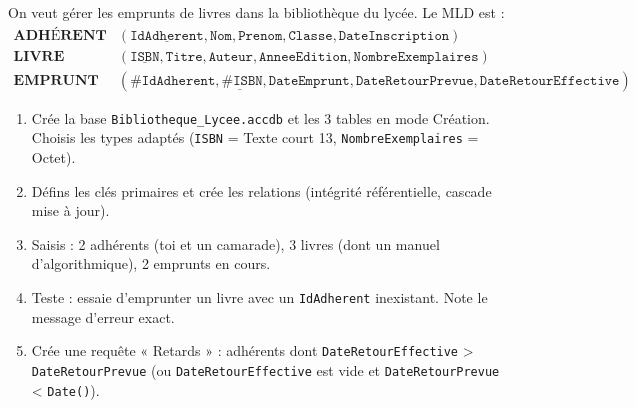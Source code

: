 \documentclass[11pt]{article}
\begin{document}
\begin{exercice}
On veut gérer les emprunts de livres dans la bibliothèque du lycée. Le MLD est :
\begin{align*}
\textbf{ADHÉRENT} &(\underline{\texttt{IdAdherent}}, \texttt{Nom}, \texttt{Prenom}, \texttt{Classe}, \texttt{DateInscription}) \\
\textbf{LIVRE}    &(\underline{\texttt{ISBN}}, \texttt{Titre}, \texttt{Auteur}, \texttt{AnneeEdition}, \texttt{NombreExemplaires}) \\
\textbf{EMPRUNT}  &(\underline{\texttt{\#IdAdherent}, \texttt{\#ISBN}, \texttt{DateEmprunt}}, \texttt{DateRetourPrevue}, \texttt{DateRetourEffective})
\end{align*}
\begin{enumerate}
    \item Crée la base \texttt{Bibliotheque\_Lycee.accdb} et les 3 tables en mode Création. Choisis les types adaptés (\texttt{ISBN} = Texte court 13, \texttt{NombreExemplaires} = Octet).
    \item Défins les clés primaires et crée les relations (intégrité référentielle, cascade mise à jour).
    \item Saisis : 2 adhérents (toi et un camarade), 3 livres (dont un manuel d'algorithmique), 2 emprunts en cours.
    \item Teste : essaie d'emprunter un livre avec un \texttt{IdAdherent} inexistant. Note le message d'erreur exact.
    \item Crée une requête « Retards » : adhérents dont \texttt{DateRetourEffective} > \texttt{DateRetourPrevue} (ou \texttt{DateRetourEffective} est vide et \texttt{DateRetourPrevue} < \texttt{Date()}).
\end{enumerate}
\end{exercice}
\end{document}
